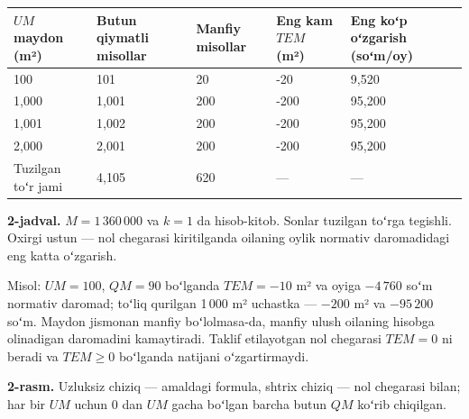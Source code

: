 \documentclass[14pt,a4paper]{extarticle}
\begin{document}
\begingroup\fontsize{11bp}{13.2bp}\selectfont
\begin{longtable}{p{} p{} p{} p{} p{}}
\toprule
$UM$ maydon (m²) & Butun qiymatli misollar & Manfiy misollar & Eng kam $TEM$ (m²) & Eng koʻp oʻzgarish (soʻm/oy) \\
\midrule
\endhead
100 & 101 & 20 & -20 & 9,520 \\
1,000 & 1,001 & 200 & -200 & 95,200 \\
1,001 & 1,002 & 200 & -200 & 95,200 \\
2,000 & 2,001 & 200 & -200 & 95,200 \\
Tuzilgan toʻr jami & 4,105 & 620 & — & — \\
\bottomrule
\end{longtable}
\endgroup
\textbf{2-jadval.} $M=1\,360\,000$ va $k=1$ da hisob-kitob. Sonlar tuzilgan toʻrga tegishli. Oxirgi ustun — nol chegarasi kiritilganda oilaning oylik normativ daromadidagi eng katta oʻzgarish.

Misol: $UM=100$, $QM=90$ boʻlganda $TEM=-10$ m² va oyiga $-4\,760$ soʻm normativ daromad; toʻliq qurilgan 1\,000 m² uchastka — $-200$ m² va $-95\,200$ soʻm. Maydon jismonan manfiy boʻlolmasa-da, manfiy ulush oilaning hisobga olinadigan daromadini kamaytiradi. Taklif etilayotgan nol chegarasi $TEM=0$ ni beradi va $TEM\ge0$ boʻlganda natijani oʻzgartirmaydi.

\begin{center}
\end{center}
\textbf{2-rasm.} Uzluksiz chiziq — amaldagi formula, shtrix chiziq — nol chegarasi bilan; har bir $UM$ uchun $0$ dan $UM$ gacha boʻlgan barcha butun $QM$ koʻrib chiqilgan.
\end{document}
